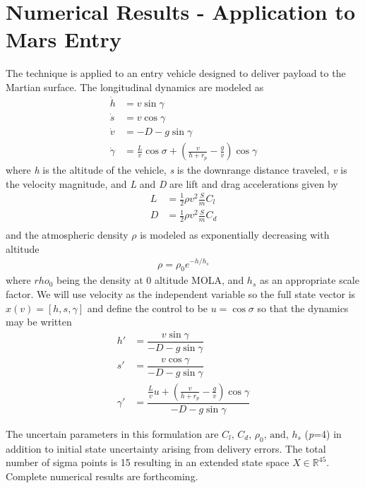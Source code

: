 \documentclass[10pt,a4paper]{article}
\begin{document}
	\section{Numerical Results - Application to Mars Entry}
	The technique is applied to an entry vehicle designed to deliver payload to the Martian surface. The longitudinal dynamics are modeled as 
	\begin{align}
	\dot{h} &= v\sin\gamma\\
	\dot{s} &= v\cos\gamma\\
	\dot{v} &= -D - g\sin\gamma \\
	\dot{\gamma} &= \frac{L}{v}\cos\sigma + \left(\frac{v}{h+r_p}-\frac{g}{v}\right)\cos\gamma
	\end{align}
	where \textit{h} is the altitude of the vehicle, \textit{s} is the downrange distance traveled, \textit{v} is the velocity magnitude, and \textit{L} and \textit{D} are lift and drag accelerations given by	
	\begin{align}
	L &= \frac{1}{2}\rho v^2\frac{S}{m}C_l\\
	D &= \frac{1}{2}\rho v^2\frac{S}{m}C_d\\
	\end{align}
	and the atmospheric density $\rho$ is modeled as exponentially decreasing with altitude
	\begin{align}
	\rho = \rho_0e^{-h/h_s} 
	\end{align}
	where $rho_0$ being the density at 0 altitude MOLA, and $h_s$ as an appropriate scale factor.  
	We will use velocity as the independent variable so the full state vector is $x(v) = [h,s,\gamma]$ and define the control to be $u=\cos\sigma$ so that the dynamics may be written
	\begin{align}
	h' &= \dfrac{v\sin\gamma}{-D - g\sin\gamma}\\
	s' &= \dfrac{v\cos\gamma}{-D - g\sin\gamma}\\
	\gamma' &= \dfrac{\frac{L}{v}u + \left(\frac{v}{h+r_p}-\frac{g}{v}\right)\cos\gamma}{-D - g\sin\gamma}
	\end{align} 
	
	The uncertain parameters in this formulation are $C_l,\,C_d,\,\rho_0,\,\mathrm{ and},\,h_s$ (\textit{p}=4) in addition to initial state uncertainty arising from delivery errors. The total number of sigma points is 15 resulting in an extended state space $X \in \mathbb{R}^{45} $. Complete numerical results are forthcoming.
	
\end{document}
